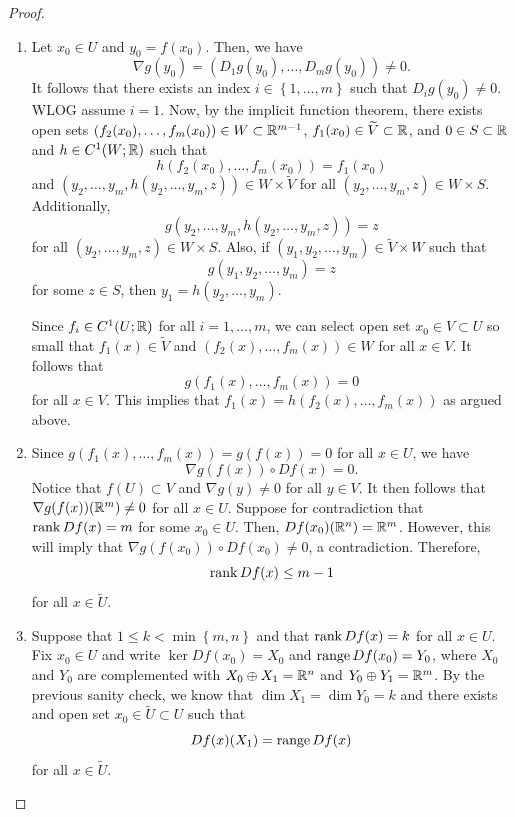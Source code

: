 \documentclass[a4paper]{article}
\begin{document}
\begin{proof}
{
\newcommand{\py}{{P_{Y_0}}}
\newcommand{\pyy}{{P_{Y_1}}}
\newcommand{\px}{{P_{X_0}}}
\newcommand{\pxx}{{P_{X_1}}} 
\begin{enumerate}
\item Let $x_0 \in U$ and $y_0 = f(x_0)$. Then, we have 
\[
\nabla g(y_0) = (D_1 g (y_0), \dots, D_m g(y_0)) \neq 0.
\]
It follows that there exists an index $i \in 
\left\{ 1, \dots, m \right\}$ such that $D_i g(y_0) \neq 0$.
WLOG assume $i = 1$.
Now, by the implicit function theorem, there exists open 
sets $(f_2(x_0), \dots, f_m(x_0)) \in W \subset \mathbb{R}^{m-1}$, 
$f_1(x_0) \in \widetilde{V} \subset \mathbb{R}$, and $0 \in S \subset \mathbb{R}$
and $h \in C^1(W ; \mathbb{R})$ such that 
\[
h(f_2(x_0), \dots, f_m(x_0)) = f_1(x_0)
\]
and 
$(y_2, \dots, y_m, h(y_2, \dots, y_m, z)) \in W 
\times \tilde{V}$ for all $(y_2, \dots, y_m, z) \in W \times S$.
Additionally,
\[
g(y_2, \dots, y_m, h(y_2, \dots, y_m, z)) = z 
\]
for all $(y_2, \dots, y_m, z) \in W \times S$.
Also, if $(y_1, y_2, \dots, y_m) \in \tilde{V} \times W$
such that 
\[
g(y_1, y_2, \dots, y_m) = z
\]
for some $z \in S$,
then $y_1 = h(y_2, \dots, y_m)$. 

Since $f_i \in C^1(U; \mathbb{R})$ for all $i = 1, \dots, m$, 
we can select open set $x_0 \in V \subset U$ so small that 
$f_1(x) \in \tilde{V}$ and $(f_2(x), \dots, f_m(x)) \in W$
for all $x \in V$. It follows that 
\[
g(f_1(x), \dots, f_m(x)) = 0
\]
for all $x \in V$. This implies that $f_1(x) = h(f_2(x), 
\dots, f_m(x))$ as argued above. 

\item Since $g(f_1(x), \dots, f_m(x)) = g(f(x)) = 0$
for all $x \in U$, we have 
\[
\nabla g(f(x)) \circ Df(x) = 0.
\]
Notice that $f(U) \subset V$ and $\nabla g(y) \neq 0$ 
for all $y \in V$. It then follows that 
$\nabla g(f(x)) (\mathbb{R}^m) \neq 0$
for all $x \in U$.
Suppose for contradiction that $\operatorname{rank} Df(x) = m$ for 
some $x_0 \in U$. Then, $Df(x_0) (\mathbb{R}^n) = \mathbb{R}^m$.
However, this will imply that $\nabla g(f(x_0)) \circ Df(x_0)
\neq 0$, a contradiction. Therefore, 
\[
\operatorname{rank} Df(x) \leq m - 1
\]
for all $x \in \tilde{U}$. 

\item Suppose that $1 \leq k < \min \left\{ m, n \right\}$
and that $\operatorname{rank} Df(x) = k$ for all $x \in U$. 
Fix $x_0 \in U$ and write $\ker Df(x_0) = X_0$ and 
$\operatorname{range} Df(x_0) = Y_0$, where $X_0$ and $Y_0$ are complemented 
with $X_0 \oplus X_1 = \mathbb{R}^n$ and 
$Y_0 \oplus Y_1 = \mathbb{R}^m$. 
By the previous sanity check, we know that 
$\dim X_1 = \dim Y_0 = k$ and 
there exists and open set $x_0 \in \tilde{U} \subset U$ 
such that 
\[
Df(x)(X_1) = \operatorname{range} Df(x) 
\]
for all $x \in \tilde{U}$. 


\end{enumerate}}
\end{proof}
\end{document}
